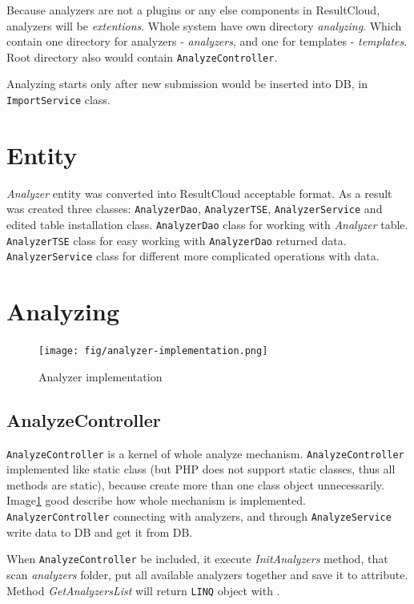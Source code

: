 Because analyzers are not a plugins or any else components in ResultCloud, analyzers will be \emph{extentions}. Whole system have own directory \emph{analyzing}. Which contain one directory for analyzers - \emph{analyzers}, and one for templates - \emph{templates}. Root directory also would contain \texttt{AnalyzeController}.

Analyzing starts only after new submission would be inserted into DB, in \texttt{ImportService} class.

\section{Entity}

\emph{Analyzer} entity was converted into ResultCloud acceptable format. As a result was created three classes: \texttt{AnalyzerDao}, \texttt{AnalyzerTSE}, \texttt{AnalyzerService} and edited table installation class. \texttt{AnalyzerDao} class for working with \emph{Analyzer} table. \texttt{AnalyzerTSE} class for easy working with \texttt{AnalyzerDao} returned data. \texttt{AnalyzerService} class for different more complicated operations with data.

\section{Analyzing}

\begin{figure}
  \centering
    \texttt{[image: fig/analyzer-implementation.png]}
  \caption{Analyzer implementation}
  \label{fig:an_impl}
\end{figure}

\subsection{AnalyzeController}

\texttt{AnalyzeController} is a kernel of whole analyze mechanism. \texttt{AnalyzeController} implemented like static class (but PHP does not support static classes, thus all methods are static), because create more than one class object unnecessarily. Image\ref{fig:an_impl} good describe how whole mechanism is implemented. \texttt{AnalyzerController} connecting with analyzers, and through \texttt{AnalyzeService} write data to DB and get it from DB.

When \texttt{AnalyzeController} be included, it execute \emph{InitAnalyzers} method, that scan \emph{analyzers} folder, put all available analyzers together and save it to \emph{} attribute. Method \emph{GetAnalyzersList} will return \texttt{LINQ} object with \emph{}.

